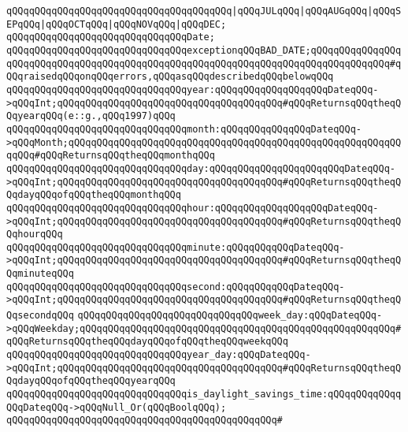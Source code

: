 \verb|qQQqqQQqqQQqqQQqqQQqqQQqqQQqqQQqqQQqqQQq|\verb#|qQQqJULqQQq|qQQqAUGqQQq|qQQqSEPqQQq|qQQqOCTqQQq|qQQqNOVqQQq|qQQqDEC;#\newline
\newline
\verb|qQQqqQQqqQQqqQQqqQQqqQQqqQQqqQQqDate;|\newline
\newline
\verb|qQQqqQQqqQQqqQQqqQQqqQQqqQQqqQQqexceptionqQQqBAD_DATE;qQQqqQQqqQQqqQQqqQQqqQQqqQQqqQQqqQQqqQQqqQQqqQQqqQQqqQQqqQQqqQQqqQQqqQQqqQQqqQQqqQQq#qQQqraisedqQQqonqQQqerrors,qQQqasqQQqdescribedqQQqbelowqQQq|\newline
\newline
\verb|qQQqqQQqqQQqqQQqqQQqqQQqqQQqqQQqyear:qQQqqQQqqQQqqQQqqQQqDateqQQq->qQQqInt;qQQqqQQqqQQqqQQqqQQqqQQqqQQqqQQqqQQqqQQq#qQQqReturnsqQQqtheqQQqyearqQQq(e::g.,qQQq1997)qQQq|\newline
\verb|qQQqqQQqqQQqqQQqqQQqqQQqqQQqqQQqmonth:qQQqqQQqqQQqqQQqDateqQQq->qQQqMonth;qQQqqQQqqQQqqQQqqQQqqQQqqQQqqQQqqQQqqQQqqQQqqQQqqQQqqQQqqQQqqQQq#qQQqReturnsqQQqtheqQQqmonthqQQq|\newline
\verb|qQQqqQQqqQQqqQQqqQQqqQQqqQQqqQQqday:qQQqqQQqqQQqqQQqqQQqqQQqDateqQQq->qQQqInt;qQQqqQQqqQQqqQQqqQQqqQQqqQQqqQQqqQQqqQQq#qQQqReturnsqQQqtheqQQqdayqQQqofqQQqtheqQQqmonthqQQq|\newline
\verb|qQQqqQQqqQQqqQQqqQQqqQQqqQQqqQQqhour:qQQqqQQqqQQqqQQqqQQqDateqQQq->qQQqInt;qQQqqQQqqQQqqQQqqQQqqQQqqQQqqQQqqQQqqQQq#qQQqReturnsqQQqtheqQQqhourqQQq|\newline
\verb|qQQqqQQqqQQqqQQqqQQqqQQqqQQqqQQqminute:qQQqqQQqqQQqDateqQQq->qQQqInt;qQQqqQQqqQQqqQQqqQQqqQQqqQQqqQQqqQQqqQQq#qQQqReturnsqQQqtheqQQqminuteqQQq|\newline
\verb|qQQqqQQqqQQqqQQqqQQqqQQqqQQqqQQqsecond:qQQqqQQqqQQqDateqQQq->qQQqInt;qQQqqQQqqQQqqQQqqQQqqQQqqQQqqQQqqQQqqQQq#qQQqReturnsqQQqtheqQQqsecondqQQq|\newline
\verb|qQQqqQQqqQQqqQQqqQQqqQQqqQQqqQQqweek_day:qQQqDateqQQq->qQQqWeekday;qQQqqQQqqQQqqQQqqQQqqQQqqQQqqQQqqQQqqQQqqQQqqQQqqQQqqQQq#qQQqReturnsqQQqtheqQQqdayqQQqofqQQqtheqQQqweekqQQq|\newline
\verb|qQQqqQQqqQQqqQQqqQQqqQQqqQQqqQQqyear_day:qQQqDateqQQq->qQQqInt;qQQqqQQqqQQqqQQqqQQqqQQqqQQqqQQqqQQqqQQq#qQQqReturnsqQQqtheqQQqdayqQQqofqQQqtheqQQqyearqQQq|\newline
\newline
\verb|qQQqqQQqqQQqqQQqqQQqqQQqqQQqqQQqis_daylight_savings_time:qQQqqQQqqQQqqQQqDateqQQq->qQQqNull_Or(qQQqBoolqQQq);|\newline
\verb|qQQqqQQqqQQqqQQqqQQqqQQqqQQqqQQqqQQqqQQqqQQqqQQq#|\newline
